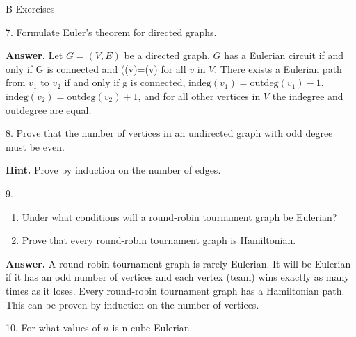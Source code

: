 \documentclass[10pt,]{book}
\theoremstyle{plain}
\theoremstyle{definition}
\theoremstyle{definition}
\theoremstyle{definition}
\theoremstyle{definition}
\theoremstyle{definition}
\numberwithin{equation}{section}
\begin{document}
\par\smallskip\noindent
\hypertarget{exercisegroup-6}{}\typeout{************************************************}
\typeout{************************************************}
B Exercises%
\begin{exercisegroup}
\item[7.]\hypertarget{exercise-27}{} Formulate Euler's theorem for directed graphs.%
\par\smallskip
\par\smallskip
\noindent\textbf{Answer.}\hypertarget{answer-9}{}\quad
Let  \(G=(V,E)\) be a directed graph. \(G\) has a Eulerian circuit if and only if G is connected and ((v)=(v)\) for all \(v\) in \(V\). There exists a Eulerian path from  \(v_1\textrm{ to } v_2\)  if and only if 
g is connected, \(\text{indeg}\left(v_1\right)=\text{outdeg}\left(v_1\right)-1\), \(\text{indeg}\left(v_2\right)=\text{outdeg}\left(v_2\right)+1\),
 and for all other vertices in \(V\) the indegree and outdegree are equal.%
\item[8.]\hypertarget{exercise-28}{} Prove that the number of vertices in an undirected graph with odd degree must be even.%
\par\smallskip
\par\smallskip
\noindent\textbf{Hint.}\hypertarget{hint-1}{}\quad
 Prove by induction on the number of edges.%
\item[9.]\hypertarget{exercise-29}{}\leavevmode%
\begin{enumerate}[label=\alph*]
\item\hypertarget{li-65}{}Under what conditions will a round-robin tournament graph be Eulerian?%
\item\hypertarget{li-66}{}Prove that every round-robin tournament graph is Hamiltonian.%
\end{enumerate}
%
\par\smallskip
\par\smallskip
\noindent\textbf{Answer.}\hypertarget{answer-10}{}\quad
 A round-robin tournament graph is rarely Eulerian. It will be Eulerian if it has an odd number of vertices and each vertex (team) wins exactly
as many times as it loses. Every round-robin tournament graph has a Hamiltonian path. This can be proven by induction on the number of vertices.%
\item[10.]\hypertarget{exercise-30}{} For what values of \(n\) is  n-cube Eulerian.%
\par\smallskip
\end{exercisegroup}
\par\smallskip\noindent
\typeout{************************************************}
\typeout{************************************************}
\end{document}
